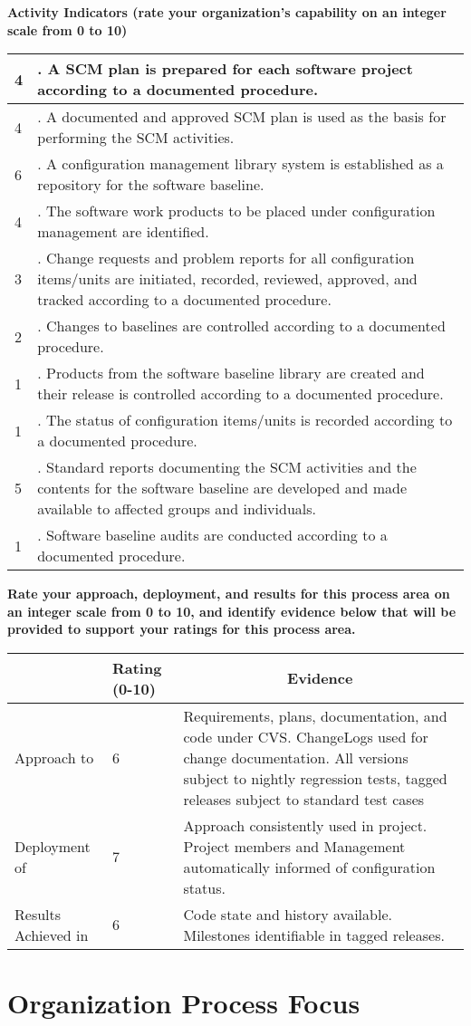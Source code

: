 \documentclass{article}
\newcommand{\KPAname}{}
\let\KPAsection=\section
\renewcommand{\section}[1]{\renewcommand{\KPAname}{#1}\KPAsection{#1}}
\newcounter{activity}		%
\newenvironment{KPAActivity}
{
    \setcounter{activity}{0} %
    {\bf Activity Indicators (rate your organization's capability
    on an integer scale from 0 to 10)} %
    \begin{center}
    \begin{tabular}{|p{0.5in}|p{6.0in}|} \hline %
}
{
    \end{tabular}
    \end{center}
}
\newcommand{\Activity}[2]
{
    \stepcounter{activity} #1 & \arabic{activity}. #2 \\ \hline
} %
\newenvironment{KPARate}
{
    {\bf Rate your approach, deployment, and results for
    this process area on an integer scale from 0 to 10, and 
    identify evidence below that will be provided to support your
    ratings for this process area.}
    \begin{center}
    \begin{tabular}{|p{1.0in}|p{0.5in}|p{5.0in}|} \hline
    & Rating (0-10) & \multicolumn{1}{c|}{Evidence} \\ \hline
}
{
    \end{tabular}
    \end{center}
}
\newcommand{\Approach}[2]{Approach to \KPAname & #1 & #2 \\ \hline}
\newcommand{\Deployment}[2]{Deployment of \KPAname & #1 & #2 \\ \hline}
\newcommand{\Results}[2]{Results Achieved in \KPAname & #1 & #2 \\
	\hline}
\begin{document}
\begin{KPAActivity}
\Activity{4}{A SCM plan is prepared for each software project
according to a documented procedure.}
\Activity{4}{A documented and approved SCM plan is used as the basis
for performing the SCM activities.}
\Activity{6}{A configuration management library system is established
as a repository for the software baseline.}
\Activity{4}{The software work products to be placed under
configuration management are identified.}
\Activity{3}{Change requests and problem reports for all configuration
items/units are initiated, recorded, reviewed, approved, and tracked
according to a documented procedure.}
\Activity{2}{Changes to baselines are controlled according to a
documented procedure.}
\Activity{1}{Products from the software baseline library are created
and their release is controlled according to a documented procedure.}
\Activity{1}{The status of configuration items/units is recorded
according to a documented procedure.}
\Activity{5}{Standard reports documenting the SCM activities and the
contents for the software baseline are developed and made available to
affected groups and individuals.}
\Activity{1}{Software baseline audits are conducted according to a
documented procedure.}
\end{KPAActivity}

\begin{KPARate}
\Approach{6}{Requirements, plans, documentation, and code under CVS.
             ChangeLogs used for change documentation.  All versions
             subject to nightly regression tests, tagged
             releases subject to standard test cases}
\Deployment{7}{Approach consistently used in project. Project members
             and Management automatically informed of configuration
             status.}
\Results{6}{Code state and history available.  Milestones identifiable
            in tagged releases.}
\end{KPARate}

\newpage
\section{Organization Process Focus}
\end{document}

